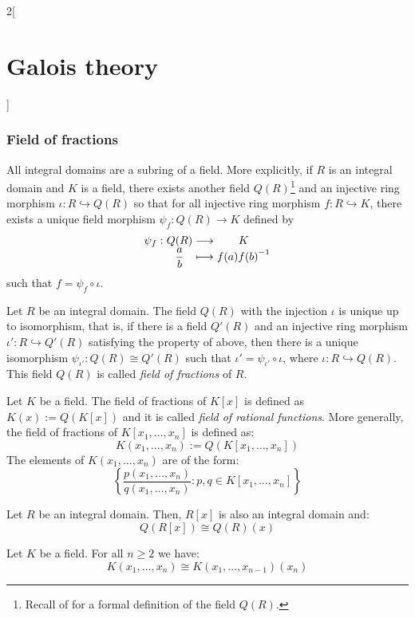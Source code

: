 \documentclass[../../../main_math.tex]{subfiles}
\begin{document}
\begin{multicols}{2}[\section{Galois theory}]
  \subsubsection{Field of fractions}
  \begin{theorem}
    All integral domains are a subring of a field. More explicitly, if $R$ is an integral domain and $K$ is a field, there exists another field $Q(R)$\footnote{Recall  of  for a formal definition of the field $Q(R)$.} and an injective ring morphism $\iota:R\hookrightarrow Q(R)$ so that for all injective ring morphism $f:R\hookrightarrow K$, there exists a unique field morphism $\psi_f:Q(R)\rightarrow K$ defined by
    $$
      \function{\psi_f}{Q(R)}{K}{\displaystyle\frac{a}{b}}{f(a){f(b)}^{-1}}
    $$
    such that $f=\psi_f\circ\iota$.
  \end{theorem}
  \begin{corollary}
    Let $R$ be an integral domain. The field $Q(R)$ with the injection $\iota$ is unique up to isomorphism, that is, if there is a field $Q'(R)$ and an injective ring morphism $\iota':R\hookrightarrow Q'(R)$ satisfying the property of above, then there is a unique isomorphism $\psi_{\iota'}:Q(R)\cong Q'(R)$ such that $\iota'=\psi_{\iota'}\circ\iota$, where $\iota:R\hookrightarrow Q(R)$. This field $Q(R)$ is called \emph{field of fractions} of $R$.
  \end{corollary}
  \begin{definition}
    Let $K$ be a field. The field of fractions of $K[x]$ is defined as $K(x):=Q(K[x])$ and it is called \emph{field of rational functions}. More generally, the field of fractions of $K[x_1,\ldots,x_n]$ is defined as: $$K(x_1,\ldots,x_n):=Q(K[x_1,\ldots,x_n])$$ The elements of $K(x_1,\ldots,x_n)$ are of the form: $$\left\{\frac{p(x_1,\ldots,x_n)}{q(x_1,\ldots,x_n)}:p,q\in K[x_1,\ldots,x_n]\right\}$$
  \end{definition}
  \begin{lemma}
    Let $R$ be an integral domain. Then, $R[x]$ is also an integral domain and: $$Q(R[x])\cong Q(R)(x)$$
  \end{lemma}
  \begin{corollary}
    Let $K$ be a field. For all $n\geq 2$ we have: $$K(x_1,\ldots,x_n)\cong K(x_1,\ldots,x_{n-1})(x_n)$$
  \end{corollary}

\end{multicols}
\end{document}
